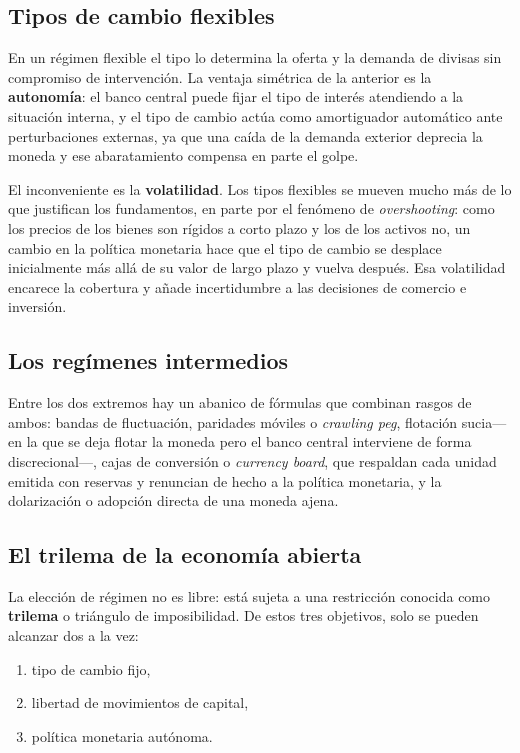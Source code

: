 \subsection{Tipos de cambio flexibles}

En un régimen flexible el tipo lo determina la oferta y la demanda de divisas
sin compromiso de intervención. La ventaja simétrica de la anterior es la
\textbf{autonomía}: el banco central puede fijar el tipo de interés atendiendo a
la situación interna, y el tipo de cambio actúa como amortiguador automático
ante perturbaciones externas, ya que una caída de la demanda exterior deprecia
la moneda y ese abaratamiento compensa en parte el golpe.

El inconveniente es la \textbf{volatilidad}. Los tipos flexibles se mueven mucho
más de lo que justifican los fundamentos, en parte por el fenómeno de
\emph{overshooting}: como los precios de los bienes son rígidos a corto plazo y
los de los activos no, un cambio en la política monetaria hace que el tipo de
cambio se desplace inicialmente más allá de su valor de largo plazo y vuelva
después. Esa volatilidad encarece la cobertura y añade incertidumbre a las
decisiones de comercio e inversión.

\subsection{Los regímenes intermedios}

Entre los dos extremos hay un abanico de fórmulas que combinan rasgos de ambos:
bandas de fluctuación, paridades móviles o \emph{crawling peg}, flotación
sucia—en la que se deja flotar la moneda pero el banco central interviene de
forma discrecional—, cajas de conversión o \emph{currency board}, que respaldan
cada unidad emitida con reservas y renuncian de hecho a la política monetaria, y
la dolarización o adopción directa de una moneda ajena.

\subsection{El trilema de la economía abierta}

La elección de régimen no es libre: está sujeta a una restricción conocida como
\textbf{trilema} o triángulo de imposibilidad. De estos tres objetivos, solo se
pueden alcanzar dos a la vez:

\begin{enumerate}
    \item tipo de cambio fijo,
    \item libertad de movimientos de capital,
    \item política monetaria autónoma.
\end{enumerate}

